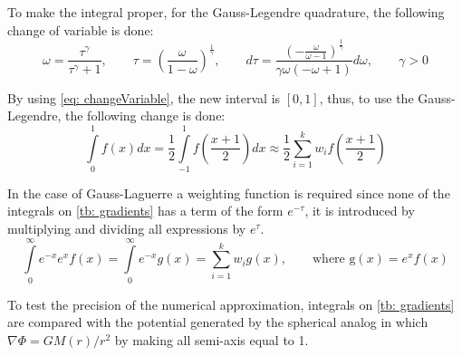 		To make the integral proper, for the Gauss-Legendre quadrature, the following change of variable is done:
		\begin{equation}\label{eq: changeVariable}
			\omega = \dfrac{\tau^\gamma}{\tau^\gamma + 1}, \qquad \tau = \left(\frac{\omega}{1-\omega}\right)^{\frac{1}{\gamma}}, \qquad d\tau = \dfrac{\left(- \frac{\omega}{\omega - 1}\right)^{\frac{1}{\gamma}}}{\gamma \omega \left(- \omega + 1\right)} d\omega, \qquad \gamma > 0
		\end{equation} 
		
		By using \autoref{eq: changeVariable}, the new interval is $[0, 1]$, thus, to use the Gauss-Legendre, the following change is done:
		\begin{equation}
			\int\limits_{0}^{1}f(x)dx = \dfrac{1}{2}\int\limits_{-1}^{1}f\left(\dfrac{x + 1}{2}\right)dx \approx \dfrac{1}{2}\sum_{i = 1}^{k}w_if\left(\dfrac{x + 1}{2}\right)
		\end{equation}
		
		In the case of Gauss-Laguerre a weighting function is required since none of the integrals on \autoref{tb: gradients} has a term of the form $e^{-\tau}$, it is introduced by multiplying and dividing all expressions by $e^{\tau}$.
		\begin{equation}
			\int\limits_{0}^{\infty}e^{-x}e^{x}f(x) = \int\limits_{0}^{\infty}e^{-x}g(x) = \sum_{i = 1}^{k}w_i g(x), \qquad \text{where g$(x) = e^xf(x)$}
		\end{equation}
		
		To test the precision of the numerical approximation, integrals on \autoref{tb: gradients} are compared with the potential generated by the spherical analog in which $\nabla\Phi = GM(r)/r^2$ by making all semi-axis equal to 1.
		
